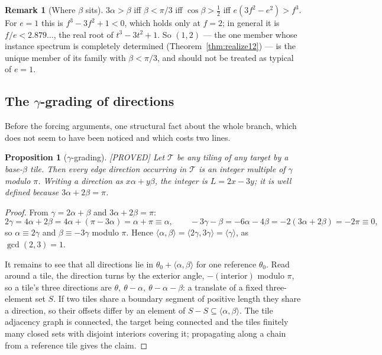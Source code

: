 \documentclass[11pt,reqno]{amsart}
\theoremstyle{plain}
\newtheorem{proposition}[theorem]{Proposition}
\theoremstyle{definition}
\newtheorem{remark}[theorem]{Remark}
\newcommand{\lab}[1]{\hfill\textnormal{\footnotesize\textsc{[#1]}}}
\begin{document}
\begin{remark}[Where $\beta$ sits]\label{rem:betapi3}
$3\alpha>\beta$ iff $\beta<\pi/3$ iff $\cos\beta>\tfrac12$ iff $e(3f^2-e^2)>f^3$. For $e=1$ this is
$f^3-3f^2+1<0$, which holds only at $f=2$; in general it is $f/e<2.879\ldots$, the real root of
$t^3-3t^2+1$. So $(1,2)$ --- the one member whose instance spectrum is completely determined
(Theorem~\ref{thm:realize12}) --- is the unique member of its family with $\beta<\pi/3$, and should
not be treated as typical of $e=1$.
\end{remark}

\subsection{The \texorpdfstring{$\gamma$}{gamma}-grading of directions}\label{sub:gammagrading}
Before the forcing arguments, one structural fact about the whole branch, which does not seem to have
been noticed and which costs two lines.

\begin{proposition}[$\gamma$-grading]\label{prop:gammagrading}\lab{PROVED}
Let $\mathcal T$ be any tiling of any target by a base-$\beta$ tile. Then every edge direction
occurring in $\mathcal T$ is an integer multiple of $\gamma$ modulo $\pi$. Writing a direction as
$x\alpha+y\beta$, the integer is $L=2x-3y$; it is well defined because $3\alpha+2\beta=\pi$.
\end{proposition}
\begin{proof}
From $\gamma=2\alpha+\beta$ and $3\alpha+2\beta=\pi$:
\[
2\gamma=4\alpha+2\beta=4\alpha+(\pi-3\alpha)=\alpha+\pi\equiv\alpha,
\qquad
-3\gamma-\beta=-6\alpha-4\beta=-2(3\alpha+2\beta)=-2\pi\equiv0 ,
\]
so $\alpha\equiv2\gamma$ and $\beta\equiv-3\gamma$ modulo $\pi$. Hence
$\langle\alpha,\beta\rangle=\langle2\gamma,3\gamma\rangle=\langle\gamma\rangle$, as $\gcd(2,3)=1$.

It remains to see that all directions lie in $\theta_0+\langle\alpha,\beta\rangle$ for one reference
$\theta_0$. Read around a tile, the direction turns by the exterior angle, $-(\text{interior})$
modulo $\pi$, so a tile's three directions are $\theta,\ \theta-\alpha,\ \theta-\alpha-\beta$: a
translate of a fixed three-element set $S$. If two tiles share a boundary segment of positive length
they share a direction, so their offsets differ by an element of $S-S\subseteq\langle\alpha,\beta\rangle$.
The tile adjacency graph is connected, the target being connected and the tiles finitely many closed
sets with disjoint interiors covering it; propagating along a chain from a reference tile gives the
claim.
\end{proof}
\end{document}
